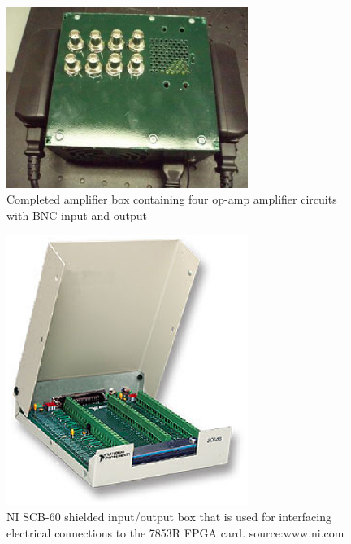 \begin{figure}[ht!]
\centering
\includegraphics[width=0.7\textwidth]{eps_pics/ampBox}
\caption{Completed amplifier box containing four op-amp amplifier circuits with BNC input and output
	 \label{fig:ampBox}} 
\end{figure}

\begin{figure}[ht!]
\centering
\includegraphics[width=0.7\textwidth]{eps_pics/ioBox}
\caption{NI SCB-60 shielded input/output box that is used for interfacing electrical connections to the 7853R FPGA card. \newline source:www.ni.com
	 \label{fig:ioBox}} 
\end{figure}

